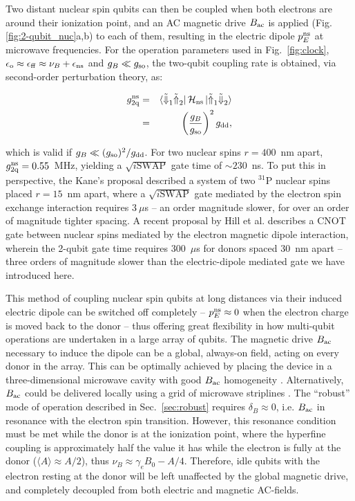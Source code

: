 Two distant nuclear spin qubits can then be coupled when both electrons are around their ionization point, and an AC magnetic drive $B_{\rm ac}$ is applied (Fig. \ref{fig:2-qubit_nuc}a,b) to each of them, resulting in the electric dipole $p_E^{\rm ns}$ at microwave frequencies. For the operation parameters used in Fig.~\ref{fig:clock}, $\epsilon_{\rm o}\approx\epsilon_{\rm ff}\approx\nu_B+\epsilon_{\rm ns}$ and $g_B\ll g_{\rm so}$, the two-qubit coupling rate is obtained, via second-order perturbation theory, as:

\begin{eqnarray} \label{eq:nucSWAP}
g_{\rm 2q}^{\rm ns} & = & \bra{\tilde{\Downarrow}_1 \tilde{\Uparrow}_2}\mathcal{H}_{\rm ns}\ket{\tilde{\Uparrow}_1 \tilde{\Downarrow}_2}\\
 & =& \left(\frac{g_B}{g_{\rm so}}\right)^2g_{\rm dd},
\end{eqnarray}
 
which is valid if $g_B\ll (g_{\rm so})^2/g_{\rm dd}$. For two nuclear spins $r=400$~nm apart, $g_{\rm 2q}^{\rm ns}=0.55$~MHz, yielding a $\sqrt{i\mathrm{SWAP}}$ gate time of $\sim230$~ns. To put this in perspective, the Kane's proposal \cite{Kane1998} described a system of  two $^{31}$P nuclear spins placed $r=15$~nm apart, where a $\sqrt{i\mathrm{SWAP}}$ gate mediated by the electron spin exchange interaction requires $3~\mu$s -- an order magnitude slower, for over an order of magnitude tighter spacing. A recent proposal by Hill et al. \cite{Hill2015} describes a CNOT gate between nuclear spins mediated by the electron magnetic dipole interaction, wherein the 2-qubit gate time requires 300~$\mu$s for donors spaced $30$~nm apart -- three orders of magnitude slower than the electric-dipole mediated gate we have introduced here.


This method of coupling nuclear spin qubits at long distances via their induced electric dipole can be switched off completely -- $p_E^{\rm ns} \approx 0$ when the electron charge is moved back to the donor -- thus offering great flexibility in how multi-qubit operations are undertaken in a large array of qubits. The magnetic drive $B_{\rm ac}$ necessary to induce the dipole can be a global, always-on field, acting on every donor in the array. This can be optimally achieved by placing the device in a three-dimensional microwave cavity with good $B_{\rm ac}$ homogeneity \cite{Angerer2016}. Alternatively, $B_{\rm ac}$ could be delivered locally using a grid of microwave striplines \cite{Li2018}. The ``robust'' mode of operation described in Sec.~\ref{sec:robust} requires $\delta_B \approx 0$, i.e. $B_{\rm ac}$ in resonance with the electron spin transition. However, this resonance condition must be met while the donor is at the ionization point, where the hyperfine coupling is approximately half the value it has while the electron is fully at the donor ($\langle A\rangle \approx A/2$), thus $\nu_B \approx \gamma_e B_0 - A/4$. Therefore, idle qubits with the electron resting at the donor will be left unaffected by the global magnetic drive, and completely decoupled from both electric and magnetic AC-fields.


